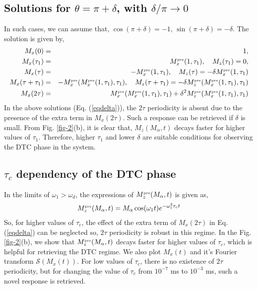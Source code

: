\documentclass[pra,aps,preprint,floatfix]{revtex4-1}
\begin{document}
\subsection{Solutions for $\theta = \pi + \delta$, with $\delta/ \pi \to 0$}
In such cases, we can assume that, $\cos(\pi + \delta ) = -1$, $\sin(\pi + \delta ) = -\delta$. The solution is given by,
\begin{eqnarray}\label{eqdelta}
M_x (0) &=&1,\\
M_x (\tau_1) &=& M_x^{\scriptscriptstyle \rm pre}(1, \tau_1), \quad M_z (\tau_1) = 0,\\
M_x (\tau) &=& -M_x^{\scriptscriptstyle \rm pre}(1, \tau_1), \quad  M_z (\tau) = -\delta M_x^{\scriptscriptstyle \rm pre}(1, \tau_1)\\
M_x (\tau + \tau_1) &=& -M_x^{\scriptscriptstyle \rm pre}(M_x^{\scriptscriptstyle \rm pre}(1, \tau_1), \tau_1), \quad M_z (\tau + \tau_1) = -\delta M_z^{\scriptscriptstyle \rm pre}(M_x^{\scriptscriptstyle \rm pre}(1, \tau_1), \tau_1)\\
M_x(2 \tau) &=&  M_x^{\scriptscriptstyle \rm pre}(M_x^{\scriptscriptstyle \rm pre}(1, \tau_1), \tau_1)  + \delta^2 M_z^{\scriptscriptstyle \rm pre}(M_x^{\scriptscriptstyle \rm pre}(1, \tau_1), \tau_1)
\end{eqnarray}
In the above solutions (Eq. (\ref{eqdelta})), the $2\tau$ periodicity is absent due to the presence of the 
extra term in $M_x (2 \tau)$. Such a response can be retrieved if $\delta$ is small. From Fig. \ref{fig-2}(b), 
it is clear that, $M_z(M_\alpha,t)$ decays faster for higher values of $\tau_1$. Therefore, higher $\tau_1$ and 
lower $\delta$ are suitable conditions for observing the DTC phase in the system.
\subsection{$\tau_c$ dependency of the DTC phase}
In the limits of $\omega_1 > \omega_d$, the expressions of $M_z^{\scriptscriptstyle \rm pre} (M_\alpha,t)$ is given as,
\begin{eqnarray}
M_z^{\scriptscriptstyle \rm pre} (M_\alpha, t) =  M_\alpha \cos (\omega_1 t)  e^{-\omega_1^2  \tau_c t}
\end{eqnarray}
So, for higher values of $\tau_c$, the effect of the extra term of $M_x (2\tau)$ in Eq. (\ref{eqdelta}) can be 
neglected so, $2\tau$ periodicity is robust in this regime. In the Fig. \ref{fig-2}(b), we show that 
$M_z^{\scriptscriptstyle \rm pre} (M_\alpha, t)$ decays faster for higher values of $\tau_c$, which is
helpful for retrieving the DTC regime. We also plot $M_x (t)$ and it's Fourier transform $\mathcal{S}(M_x (t))$. 
For low values of $\tau_c$, there is no existence of $2\tau$ periodicity, but for changing the value of $\tau_c$ 
from $10^{-7}$ ms to $10^{-3}$ ms, such a novel response is retrieved.




\end{document}
